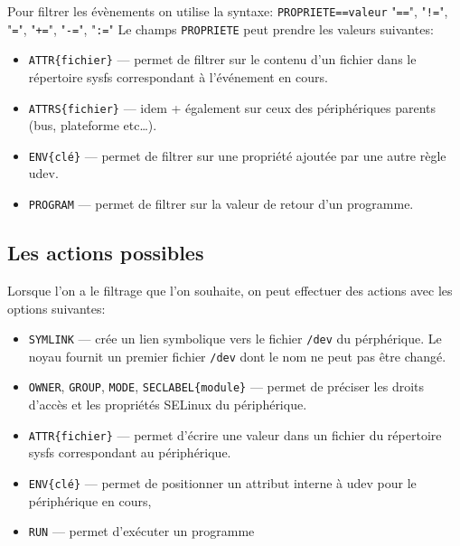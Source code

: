 \documentclass[compress,aspectratio=169]{beamer}
\begin{document}
\begin{frame}[fragile]
Pour filtrer les évènements on utilise la syntaxe: \texttt{PROPRIETE==valeur} \newline
"\texttt{==}", "\texttt{!=}", "\texttt{=}", "\texttt{+=}", "\texttt{-=}", "\texttt{:=}"
\newline
\newline
Le champs \texttt{PROPRIETE} peut prendre les valeurs suivantes:
\begin{itemize}
    \item \texttt{ATTR\{fichier\}} — permet de filtrer sur le contenu d’un fichier dans le répertoire sysfs correspondant à l’événement en cours.
    \item \texttt{ATTRS\{fichier\}} — idem + également sur ceux des périphériques parents (bus, plateforme etc…).
    \item \texttt{ENV\{clé\}} — permet de filtrer sur une propriété ajoutée par une autre règle udev.
    \item \texttt{PROGRAM} — permet de filtrer sur la valeur de retour d’un programme.
\end{itemize}
\end{frame}

\subsection{Les actions possibles}

\begin{frame}[fragile]
Lorsque l'on a le filtrage que l'on souhaite, on peut effectuer des actions avec les options suivantes:
\begin{itemize}
    \item \texttt{SYMLINK} — crée un lien symbolique vers le fichier \texttt{/dev} du pérphérique. Le  noyau fournit un premier fichier \texttt{/dev} dont le nom ne peut pas être changé.
    \item \texttt{OWNER}, \texttt{GROUP}, \texttt{MODE}, \texttt{SECLABEL\{module\}} — permet de préciser les droits d’accès et les propriétés SELinux du périphérique.
    \item \texttt{ATTR\{fichier\}} — permet d’écrire une valeur dans un fichier du répertoire sysfs correspondant au périphérique.
    \item \texttt{ENV\{clé\}} — permet de positionner un attribut interne à udev pour le périphérique en cours,
    \item \texttt{RUN} — permet d’exécuter un programme
\end{itemize}
\end{frame}
\end{document}
